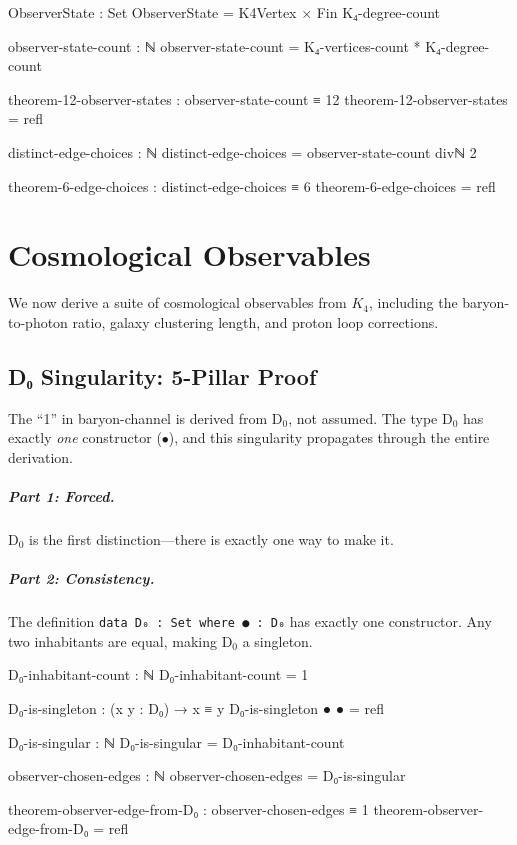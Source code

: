 \documentclass[11pt,a4paper]{book}
\begin{document}
\begin{code}
ObserverState : Set
ObserverState = K4Vertex × Fin K₄-degree-count

observer-state-count : ℕ
observer-state-count = K₄-vertices-count * K₄-degree-count

theorem-12-observer-states : observer-state-count ≡ 12
theorem-12-observer-states = refl

distinct-edge-choices : ℕ
distinct-edge-choices = observer-state-count divℕ 2

theorem-6-edge-choices : distinct-edge-choices ≡ 6
theorem-6-edge-choices = refl
\end{code}

\chapter{Cosmological Observables}
\label{chap:cosmological-observables}

We now derive a suite of cosmological observables from $K_4$, including the baryon-to-photon ratio, galaxy clustering length, and proton loop corrections.

\section{D₀ Singularity: 5-Pillar Proof}

The ``1'' in baryon-channel is derived from D$_0$, not assumed. The type D$_0$ 
has exactly \emph{one} constructor ($\bullet$), and this singularity propagates 
through the entire derivation.

\paragraph{Part 1: Forced.}
D$_0$ is the first distinction---there is exactly one way to make it.

\paragraph{Part 2: Consistency.}
The definition \texttt{data D₀ : Set where ● : D₀} has exactly one constructor. 
Any two inhabitants are equal, making D$_0$ a singleton.

\begin{code}
D₀-inhabitant-count : ℕ
D₀-inhabitant-count = 1

D₀-is-singleton : (x y : D₀) → x ≡ y
D₀-is-singleton ● ● = refl

D₀-is-singular : ℕ
D₀-is-singular = D₀-inhabitant-count

observer-chosen-edges : ℕ
observer-chosen-edges = D₀-is-singular

theorem-observer-edge-from-D₀ : observer-chosen-edges ≡ 1
theorem-observer-edge-from-D₀ = refl
\end{code}
\end{document}
